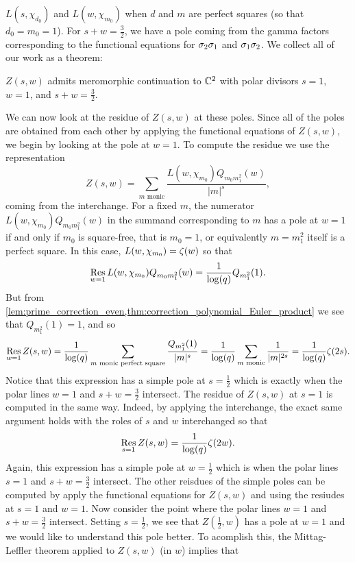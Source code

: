 \documentclass[12pt,reqno,oneside]{amsart}
\begin{document}
$L(s,\chi_{d_{0}})$ and $L(w,\chi_{m_{0}})$ when $d$ and $m$ are perfect squares (so that $d_{0} = m_{0} = 1$). For $s+w = \frac{3}{2}$, we have a pole coming from the gamma factors corresponding to the functional equations for $\sigma_{2}\sigma_{1}$ and $\sigma_{1}\sigma_{2}$. We collect all of our work as a theorem:

    \begin{theorem}
        $Z(s,w)$ admits meromorphic continuation to $\mathbb{C}^{2}$ with polar divisors $s = 1$, $w = 1$, and $s+w = \frac{3}{2}$.
    \end{theorem}

    We can now look at the residue of $Z(s,w)$ at these poles. Since all of the poles are obtained from each other by applying the functional equations of $Z(s,w)$, we begin by looking at the pole at $w = 1$. To compute the residue we use the representation
    \[
        Z(s,w) = \sum_{\text{$m$ monic}}\frac{L(w,\chi_{m_{0}})Q_{m_{0}m_{1}^{2}}(w)}{|m|^{s}},
    \]
    coming from the interchange. For a fixed $m$, the numerator $L(w,\chi_{m_{0}})Q_{m_{0}m_{1}^{2}}(w)$ in the summand corresponding to $m$ has a pole at $w = 1$ if and only if $m_{0}$ is square-free, that is $m_{0} = 1$, or equivalently $m = m_{1}^{2}$ itself is a perfect square. In this case, $L(w,\chi_{m_{0}}) = \zeta(w)$ so that
    \[
        \operatorname*{\mathrm{Res}}_{w = 1}L(w,\chi_{m_{0}})Q_{m_{0}m_{1}^{2}}(w) = \frac{1}{\log(q)}Q_{m_{1}^{2}}(1).
    \]
    But from \cref{lem:prime_correction_even,thm:correction_polynomial_Euler_product} we see that $Q_{m_{1}^{2}}(1) = 1$, and so
    \[
        \operatorname*{\mathrm{Res}}_{w = 1}Z(s,w) = \frac{1}{\log(q)}\sum_{\text{$m$ monic perfect square}}\frac{Q_{m_{1}^{2}}(1)}{|m|^{s}} = \frac{1}{\log(q)}\sum_{\text{$m$ monic}}\frac{1}{|m|^{2s}} = \frac{1}{\log(q)}\zeta(2s).
    \]
    Notice that this expression has a simple pole at $s = \frac{1}{2}$ which is exactly when the polar lines $w = 1$ and $s+w = \frac{3}{2}$ intersect. The residue of $Z(s,w)$ at $s = 1$ is computed in the same way. Indeed, by applying the interchange, the exact same argument holds with the roles of $s$ and $w$ interchanged so that
    \[
        \operatorname*{\mathrm{Res}}_{s = 1}Z(s,w) = \frac{1}{\log(q)}\zeta(2w).
    \]
    Again, this expression has a simple pole at $w = \frac{1}{2}$ which is when the polar lines $s = 1$ and $s+w = \frac{3}{2}$ intersect. The other reisdues of the simple poles can be computed by apply the functional equations for $Z(s,w)$ and using the resiudes at $s = 1$ and $w = 1$. Now consider the point where the polar lines $w = 1$ and $s+w = \frac{3}{2}$ intersect. Setting $s = \frac{1}{2}$, we see that $Z\left(\frac{1}{2},w\right)$ has a pole at $w= 1$ and we would like to understand this pole better. To acomplish this, the Mittag-Leffler theorem applied to $Z(s,w)$ (in $w$) implies that
\end{document}
